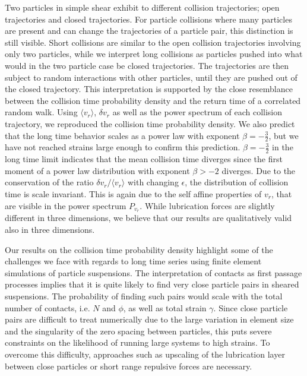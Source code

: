 \documentclass[aps,pre,twocolumn,letterpaper,floatfix,showpacs]{revtex4}
\begin{document}
Two particles in simple shear exhibit to different collision trajectories; open trajectories and closed trajectories. For particle collisions where many particles are present and can change the trajectories of a particle pair, this distinction is still visible. Short collisions are similar to the open collision trajectories involving only two particles, while we interpret long collisions as particles pushed into what would in the two particle case be closed trajectories. The trajectories are then subject to random interactions with other particles, until they are pushed out of the closed trajectory. This interpretation is supported by the close resemblance between the collision time probability density and the return time of a correlated random walk. Using $\langle v_r \rangle$, $\delta v_r$ as well as the power spectrum of each collision trajectory, we reproduced the collision time probability density. We also predict that the long time behavior scales as a power law with exponent $\beta = -\frac{3}{2}$, but we have not reached strains large enough to confirm this prediction. $\beta = -\frac{3}{2}$ in the long time limit indicates that the mean collision time diverges since the first moment of a power law distribution with exponent $\beta > -2$ diverges. Due to the conservation of the ratio $\delta v_r / \langle v_r \rangle$ with changing $\epsilon$, the distribution of collision time is scale invariant. This is again due to the self affine properties of $v_r$, that are visible in the power spectrum $P_{v_r}$. While lubrication forces are slightly different in three dimensions, we believe that our results are qualitatively valid also in three dimensions.

Our results on the collision time probability density highlight some of the challenges we face with regards to long time series using finite element simulations of particle suspensions. The interpretation of contacts as first passage processes implies that it is quite likely to find very close particle pairs in sheared suspensions. The probability of finding such pairs would scale with the total number of contacts, i.e. $N$ and $\phi$, as well as total strain $\gamma$. Since close particle pairs are difficult to treat numerically due to the large variation in element size and the singularity of the zero spacing between particles, this puts severe constraints on the likelihood of running large systems to high strains. To overcome this difficulty, approaches such as upscaling of the lubrication layer between close particles or short range repulsive forces are necessary. 
\end{document}

